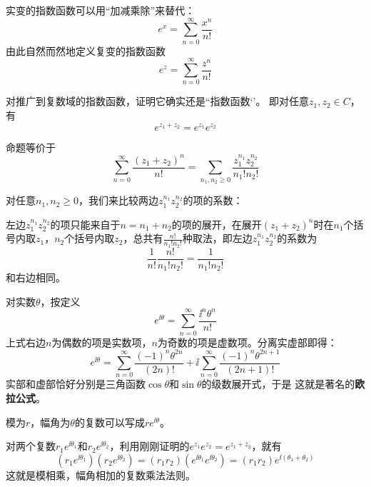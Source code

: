\documentclass[CJK]{beamer}
\begin{document}
\begin{frame}
  \bch
  实变的指数函数可以用“加减乘除”来替代：
  $$ e^x  = \sum_{n=0}^{\infty} \frac{x^n}{n!}$$
  由此自然而然地定义复变的指数函数
  $$ e^z = \sum_{n=0}^{\infty} \frac{z^n}{n!}$$
  \ech
\end{frame}

\begin{frame}
  \bch
  对推广到复数域的指数函数，证明它确实还是``指数函数‘’。
  即对任意$z_1, z_2\in C$，有
  $$e^{z_1+z_2} = e^{z_1}e^{z_2}$$
  \ech
\end{frame}


\begin{frame}
  \bch
  命题等价于
  $$\sum_{n=0}^\infty \frac{(z_1+z_2)^n}{n!} = \sum_{n_1, n_2\ge 0}\frac{z_1^{n_1}z_2^{n_2}}{n_1!n_2!}$$

  对任意$n_1,n_2\ge0$，我们来比较两边$z_1^{n_1}z_2^{n_2}$的项的系数：
  
  左边$z_1^{n_1}z_2^{n_2}$的项只能来自于$n=n_1+n_2$的项的展开，在展开$(z_1+z_2)^n$时在$n_1$个括号内取$z_1$，$n_2$个括号内取$z_2$，总共有$\frac{n!}{n_1!n_2!}$种取法，即左边$z_1^{n_1}z_2^{n_2}$的系数为
  $$\frac{1}{n!} \frac{n!}{n_1!n_2!} = \frac{1}{n_1!n_2!}$$
  和右边相同。
  \ech
\end{frame}

\begin{frame}
  \bch
  对实数$\theta$，按定义
  $$e^{\ii\theta} = \sum_{n=0}^\infty \frac{\ii^n\theta^n}{n!} $$
  上式右边$n$为偶数的项是实数项，$n$为奇数的项是虚数项。分离实虚部即得：
  $$e^{\ii\theta} = \sum_{n=0}^\infty \frac{(-1)^n\theta^{2n}}{(2n)!} + \ii  \sum_{n=0}^\infty \frac{(-1)^n\theta^{2n+1}}{(2n+1)!}$$
  实部和虚部恰好分别是三角函数$\cos\theta$和$\sin\theta$的级数展开式，于是
  这就是著名的{\bf\blue 欧拉公式}。
  \ech
\end{frame}

\begin{frame}
  \bch
      {\blue 模为$r$，幅角为$\theta$的复数可以写成$re^{\ii\theta}$。}
      
  对两个复数$r_1e^{\ii \theta_1}$和$r_2e^{\ii\theta_2}$，利用刚刚证明的$e^{z_1}e^{z_2} =e^{z_1+z_2}$，就有
  $$\left(r_1e^{\ii \theta_1}\right)\left(r_2e^{\ii\theta_2}\right) = (r_1r_2)\left(e^{\ii\theta_1}e^{\ii\theta_2}\right)= (r_1r_2)e^{\ii(\theta_1+\theta_2)}$$
      这就是模相乘，幅角相加的复数乘法法则。  
  
  \ech
\end{frame}
\end{document}
